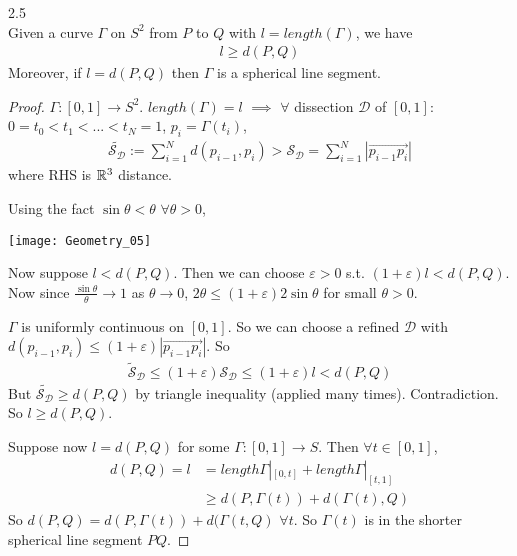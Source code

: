 \documentclass[a4paper]{article}
\begin{document}
\begin{prop} 2.5\\
Given a curve $\Gamma$ on $S^2$ from $P$ to $Q$ with $l=length(\Gamma)$, we have
\begin{equation*}
\begin{aligned}
l \geq d(P,Q)
\end{aligned}
\end{equation*}
Moreover, if $l=d(P,Q)$ then $\Gamma$ is a spherical line segment.
\begin{proof}
$\Gamma:[0,1] \to S^2$. $length(\Gamma)=l$ $\implies$ $\forall$ dissection $\mathcal{D}$ of $[0,1]$: $0=t_0<t_1<...<t_N = 1$, $p_i = \Gamma(t_i)$,
\begin{equation*}
\begin{aligned}
\tilde{\mathcal{S}_\mathcal{D}} := \sum_{i=1}^N d(p_{i-1},p_i) > \mathcal{S}_\mathcal{D} = \sum_{i=1}^N |\vec{p_{i-1}p_i}|
\end{aligned}
\end{equation*}
where RHS is $\mathbb{R}^3$ distance.

Using the fact $\sin \theta < \theta$ $\forall \theta >0$,

\texttt{[image: Geometry\_05]}

Now suppose $l<d(P,Q)$. Then we can choose $\varepsilon>0$ s.t. $(1+\varepsilon)l < d(P,Q)$. Now since $\frac{\sin\theta}{\theta} \to 1$ as $\theta \to 0$, $2\theta \leq (1+\varepsilon)2\sin\theta$ for small $\theta > 0$.

$\Gamma$ is uniformly continuous on $[0,1]$. So we can choose a refined $\mathcal{D}$ with $d(p_{i-1},p_i) \leq (1+\varepsilon) |\vec{p_{i-1}p_i}|$. So
\begin{equation*}
\begin{aligned}
\tilde{\mathcal{S}}_\mathcal{D} \leq (1+\varepsilon)\mathcal{S}_\mathcal{D} \leq (1+\varepsilon)l < d(P,Q)
\end{aligned}
\end{equation*}
But $\tilde{\mathcal{S}_\mathcal{D}} \geq d(P,Q)$ by triangle inequality (applied many times). Contradiction. So $l \geq d(P,Q)$.

Suppose now $l=d(P,Q)$ for some $\Gamma:[0,1] \to S$. Then $\forall t \in [0,1]$, 
\begin{equation*}
\begin{aligned}
d(P,Q) = l &= length \Gamma|_{[0,t]} + length \Gamma|_{[t,1]}\\
&\geq d(P,\Gamma(t)) + d(\Gamma(t),Q)
\end{aligned}
\end{equation*}
So $d(P,Q) = d(P,\Gamma(t)) + d(\Gamma(t,Q)$ $\forall t$. So $\Gamma(t)$ is in the shorter spherical line segment $PQ$.
\end{proof}
\end{prop}
\end{document}

